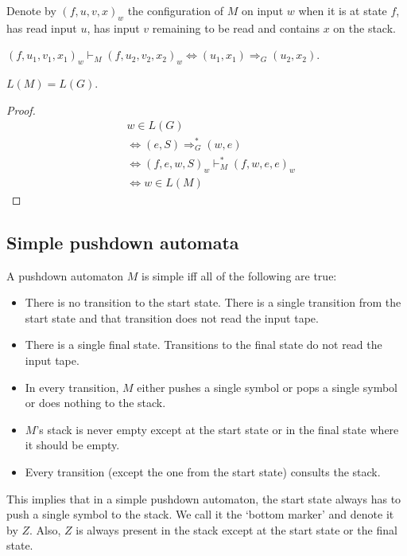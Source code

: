 Denote by $(f, u, v, x)_w$ the configuration of $M$ on input $w$ when it is at state $f$,
has read input $u$, has input $v$ remaining to be read and contains $x$ on the stack.

\begin{theorem}
$(f, u_1, v_1, x_1)_w \vdash_M (f, u_2, v_2, x_2)_w \iff (u_1, x_1) \Rightarrow_G (u_2, x_2)$.
\end{theorem}
\begin{theorem}$L(M) = L(G)$.\end{theorem}
\begin{proof}
\begin{align*}
& w \in L(G)
\\ &\iff (e, S) \Rightarrow_G^* (w, e)
\\ &\iff (f, e, w, S)_w \vdash_M^* (f, w, e, e)_w
\\ &\iff w \in L(M)
\end{align*}
\end{proof}

\subsection{Simple pushdown automata}

A pushdown automaton $M$ is simple iff all of the following are true:
\begin{itemize}
\item There is no transition to the start state.
    There is a single transition from the start state
    and that transition does not read the input tape.
\item There is a single final state.
    Transitions to the final state do not read the input tape.
\item In every transition, $M$ either pushes a single symbol or pops a single symbol or does nothing to the stack.
\item $M$'s stack is never empty except at the start state or in the final state where it should be empty.
\item Every transition (except the one from the start state) consults the stack.
\end{itemize}

This implies that in a simple pushdown automaton,
the start state always has to push a single symbol to the stack.
We call it the `bottom marker' and denote it by $Z$.
Also, $Z$ is always present in the stack except at the start state or the final state.

